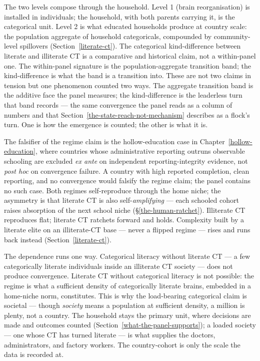 \documentclass[12pt,letterpaper]{article}
\begin{document}
The two levels compose through the household. Level 1 (brain
reorganisation) is installed in individuals; the household, with
both parents carrying it, is the categorical unit. Level 2 is what
educated households produce at country scale: the population
aggregate of household categoricals, compounded by community-level
spillovers (Section~\ref{literate-ct}). The
categorical kind-difference between literate and illiterate CT is a
comparative and historical claim, not a within-panel one. The within-panel signature is the
population-aggregate transition band; the kind-difference is what
the band is a transition into. These are not two claims in tension
but one phenomenon counted two ways. The aggregate transition band
is the additive face the panel measures; the kind-difference is the
leaderless turn that band records --- the same convergence the panel
reads as a column of numbers and that
Section~\ref{the-state-reach-not-mechanism} describes as a flock's
turn. One is how the emergence is counted; the other is what it is.

The falsifier of the regime claim is
the hollow-education case in Chapter~\ref{hollow-education},
where countries whose administrative reporting outruns observable
schooling are excluded \emph{ex ante} on independent
reporting-integrity evidence, not \emph{post hoc} on convergence
failure. A country with high reported completion, clean reporting,
and no convergence would falsify the regime claim; the
panel contains no such case. Both regimes self-reproduce through the
home niche; the asymmetry is that literate CT is also
self-\emph{amplifying} --- each schooled cohort raises absorption of
the next school niche (\S\ref{the-human-ratchet}). Illiterate CT
reproduces flat; literate CT ratchets forward and holds. Complexity
built by a literate elite on an illiterate-CT base --- never a flipped
regime --- rises and runs back instead (Section~\ref{literate-ct}).

The dependence runs one way. Categorical literacy without
literate CT --- a few categorically literate individuals inside an
illiterate CT society --- does not produce convergence. Literate
CT without categorical literacy is not possible:
the regime is what a sufficient density of categorically literate
brains, embedded in a home-niche norm, constitutes. This is why the
load-bearing categorical claim is societal --- though \emph{society}
means a population at sufficient density, a million is plenty, not a
country. The household stays the primary unit, where decisions are
made and outcomes counted (Section~\ref{what-the-panel-supports}); a
loaded society --- one whose CT has turned literate --- is what
supplies the doctors, administrators, and factory workers. The
country-cohort is only the scale the data is recorded at.
\end{document}

